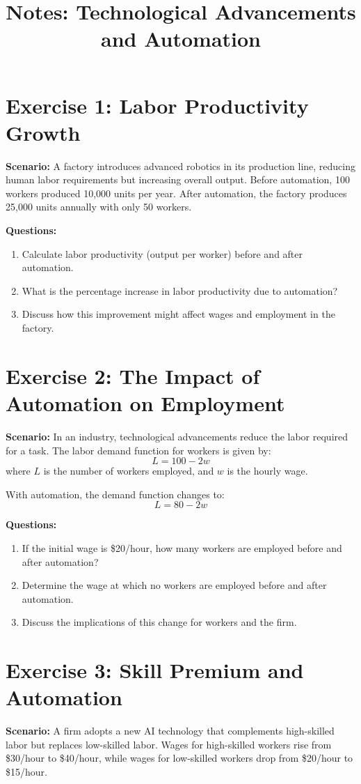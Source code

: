 \documentclass[12pt]{article}
\title{Notes: Technological Advancements and Automation}
\author{}
\date{}
\begin{document}
\maketitle

\section*{Exercise 1: Labor Productivity Growth}
\textbf{Scenario:} A factory introduces advanced robotics in its production line, reducing human labor requirements but increasing overall output. Before automation, 100 workers produced 10,000 units per year. After automation, the factory produces 25,000 units annually with only 50 workers.

\textbf{Questions:}
\begin{enumerate}
    \item Calculate labor productivity (output per worker) before and after automation.
    \item What is the percentage increase in labor productivity due to automation?
    \item Discuss how this improvement might affect wages and employment in the factory.
\end{enumerate}

\section*{Exercise 2: The Impact of Automation on Employment}
\textbf{Scenario:} In an industry, technological advancements reduce the labor required for a task. The labor demand function for workers is given by:
\[ L = 100 - 2w \]
where $L$ is the number of workers employed, and $w$ is the hourly wage.

With automation, the demand function changes to:
\[ L = 80 - 2w \]

\textbf{Questions:}
\begin{enumerate}
    \item If the initial wage is \$20/hour, how many workers are employed before and after automation?
    \item Determine the wage at which no workers are employed before and after automation.
    \item Discuss the implications of this change for workers and the firm.
\end{enumerate}

\section*{Exercise 3: Skill Premium and Automation}
\textbf{Scenario:} A firm adopts a new AI technology that complements high-skilled labor but replaces low-skilled labor. Wages for high-skilled workers rise from \$30/hour to \$40/hour, while wages for low-skilled workers drop from \$20/hour to \$15/hour.
\end{document}
